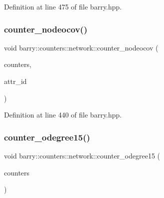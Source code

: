 Definition at line 475 of file barry.\+hpp.

\mbox{\label{namespacebarry_1_1counters_1_1network_a2804cd2dba633fdccc7a1ca6a15bdf47}} 
\subsubsection{\texorpdfstring{counter\+\_\+nodeocov()}{counter\_nodeocov()}}
{\footnotesize\ttfamily void barry\+::counters\+::network\+::counter\+\_\+nodeocov (\begin{DoxyParamCaption}\item[{\hyperlink{namespacebarry_1_1counters_1_1network_a3b3c590303d47840d1967372ae495d95}{Net\+Counter\+Vector} $\ast$}]{counters,  }\item[{\hyperlink{namespacebarry_a11dfc53ddb4672278319aa04f1e09a6c}{uint}}]{attr\+\_\+id }\end{DoxyParamCaption})\hspace{0.3cm}{\ttfamily [inline]}}



Definition at line 440 of file barry.\+hpp.

\mbox{\label{namespacebarry_1_1counters_1_1network_a7a43854f3227f5f92d3ff580e99c7136}} 
\subsubsection{\texorpdfstring{counter\+\_\+odegree15()}{counter\_odegree15()}}
{\footnotesize\ttfamily void barry\+::counters\+::network\+::counter\+\_\+odegree15 (\begin{DoxyParamCaption}\item[{\hyperlink{namespacebarry_1_1counters_1_1network_a3b3c590303d47840d1967372ae495d95}{Net\+Counter\+Vector} $\ast$}]{counters }\end{DoxyParamCaption})\hspace{0.3cm}{\ttfamily [inline]}}



